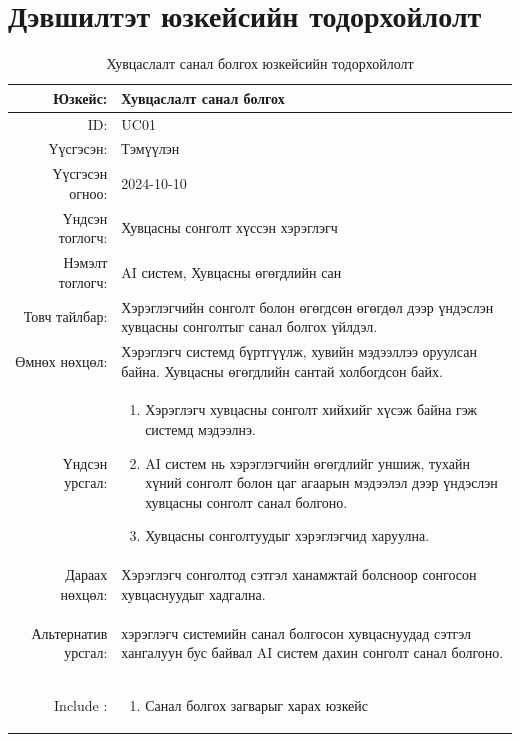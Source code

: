 \section{Дэвшилтэт юзкейсийн тодорхойлолт}
\newpage
\begin{longtable}{|r|p{11.5cm}|}
    \caption{Хувцаслалт санал болгох юзкейсийн тодорхойлолт} 
    \label{table:songolt1}\\ \hline
    {Юзкейс:} & {Хувцаслалт санал болгох}\\ \hline
    {ID:} & {UC01}\\ \hline
    {Үүсгэсэн:} & {Тэмүүлэн}\\ \hline
    {Үүсгэсэн огноо:} & {2024-10-10}\\ \hline
    {Үндсэн тоглогч:} & {Хувцасны сонголт хүссэн хэрэглэгч}\\ \hline
    {Нэмэлт тоглогч:} & {AI систем, Хувцасны өгөгдлийн сан}\\ \hline
    {Товч тайлбар:} & {Хэрэглэгчийн сонголт болон өгөгдсөн өгөгдөл дээр үндэслэн хувцасны сонголтыг санал болгох үйлдэл.}\\ \hline
    {Өмнөх нөхцөл:} & {Хэрэглэгч системд бүртгүүлж, хувийн мэдээллээ оруулсан байна. Хувцасны өгөгдлийн сантай холбогдсон байх.}\\ \hline
    {Үндсэн урсгал:} & {\begin{enumerate}
        \item Хэрэглэгч хувцасны сонголт хийхийг хүсэж байна гэж системд мэдээлнэ.
    \item AI систем нь хэрэглэгчийн өгөгдлийг уншиж, тухайн хүний сонголт болон цаг агаарын мэдээлэл дээр үндэслэн хувцасны сонголт санал болгоно.
    \item Хувцасны сонголтуудыг хэрэглэгчид харуулна.\end{enumerate}}\\\hline
    {Дараах нөхцөл:} & {Хэрэглэгч сонголтод сэтгэл ханамжтай болсноор сонгосон хувцаснуудыг хадгална.}\\ \hline
    {Альтернатив урсгал:} & {\begin{enumerate}
         хэрэглэгч системийн санал болгосон хувцаснуудад сэтгэл хангалуун бус байвал AI систем дахин сонголт санал болгоно. 
    \end{enumerate} }\\ \hline
        {Include :} & {\begin{enumerate}
        \item Санал болгох загварыг харах юзкейс
    \end{enumerate}}\\ \hline
\end{longtable}
